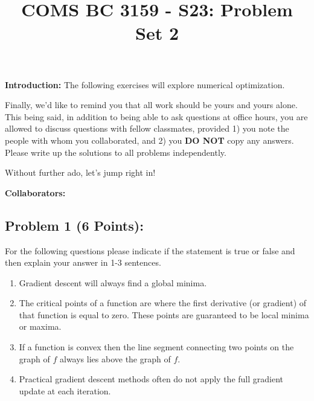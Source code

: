 \documentclass[]{article}
\title{COMS BC 3159 - S23: Problem Set 2}
\author{
}
\date{}
\begin{document}
\maketitle

\textbf{Introduction:}  
The following exercises will explore numerical optimization.

Finally, we'd like to remind you that all work should be yours and yours alone. This being said, in addition to being able to ask questions at office hours, you are allowed to discuss questions with fellow classmates, provided 1) you note the people with whom you collaborated, and 2) you \textbf{DO NOT} copy any answers. Please write up the solutions to all problems independently.

Without further ado, let's jump right in!

\bigskip
\textbf{Collaborators:}
\clearpage

\subsection*{Problem 1 (6 Points):}
For the following questions please indicate if the statement is true or false and then explain your answer in 1-3 sentences.
\begin{enumerate}[label=(\alph*)]
    \item Gradient descent will always find a global minima.
    \item The critical points of a function are where the first derivative (or gradient) of that function is equal to zero. These points are guaranteed to be local minima or maxima.
    \item If a function is convex then the line segment connecting two points on the graph of $f$ always lies above the graph of $f$.
    \item Practical gradient descent methods often do not apply the full gradient update at each iteration.
\end{enumerate}
\end{document}
